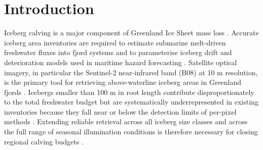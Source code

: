 \documentclass[review,jog]{igs}
\begin{document}


\section{Introduction}

Iceberg calving is a major component of Greenland Ice Sheet mass loss \citep{Enderlin2014, Alley2023}. Accurate iceberg area inventories are required to estimate submarine melt-driven freshwater fluxes into fjord systems \citep{Moon2018, Rezvanbehbahani2020} and to parameterise iceberg drift and deterioration models used in maritime hazard forecasting \citep{Keghouche2010, Marchenko2019}. Satellite optical imagery, in particular the Sentinel-2 near-infrared band (B08) at 10 m resolution, is the primary tool for retrieving above-waterline iceberg areas in Greenland fjords \citep{Sulak2017, Scheick2019}. Icebergs smaller than 100 m in root length contribute disproportionately to the total freshwater budget but are systematically underrepresented in existing inventories because they fall near or below the detection limits of per-pixel methods \citep{Rezvanbehbahani2020}. Extending reliable retrieval across all iceberg size classes and across the full range of seasonal illumination conditions is therefore necessary for closing regional calving budgets \citep{Moyer2019}.
\end{document}
